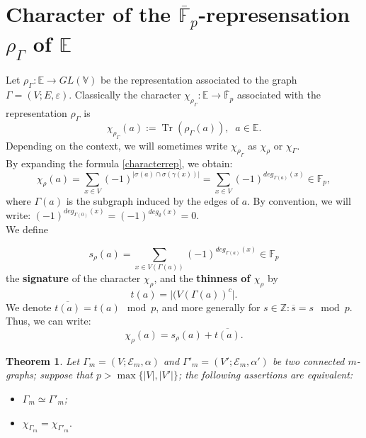 \documentclass[preprint,12pt,authoryear]{elsarticle}
\newtheorem{thm}{Theorem}[section]
\theoremstyle{definition}
\DeclareMathOperator{\Tr}{Tr}
\begin{document}
\section{Character of the $\overline{\mathbb{F}}_p$-represensation $\rho_{\Gamma}$ of $\mathbb{E}$ }


\noindent  Let ${\displaystyle \rho_{\Gamma} : \mathbb{E} \longrightarrow GL( \mathbb{V})}$ be the representation associated to the graph $\Gamma=(V;E,\varepsilon)$. 
Classically  the character $ \chi_{\rho_{\Gamma}}: \mathbb{E} \longrightarrow \overline{\mathbb{F}}_p$ associated with the representation $\rho_{\Gamma}$ is 
\begin{equation}\label{characterrep}
\chi_{\rho_{\Gamma}}(a):= \Tr(\rho_{\Gamma}(a)),  \;\; a \in \mathbb{E}.
\end{equation}
Depending on the context, we will sometimes write $\chi_{\rho_{\Gamma}}$ as $\chi_{\rho}$ or $\chi_{\Gamma}$.\\
By expanding the formula \ref{characterrep}, we obtain:
\begin{equation}
\chi_{\rho}(a) = \sum_{x \in V}(-1)^{| \sigma(a)\cap \sigma(\gamma(x))|}= \sum_{x \in V}(-1)^{deg_{\Gamma(a)}(x)} \in \mathbb{F}_p,
\end{equation}
where $\Gamma(a)$ is the subgraph induced by the edges of $a$. By convention, we will write: $ (-1)^{deg_{\Gamma(0)}(x)}=(-1)^{deg_{\emptyset}(x)} =0$.\\
We define 

\begin{equation}
s_{\rho}(a)=  \sum_{    x \in V(\Gamma(a))   }   (-1)^{deg_{\Gamma(a)}(x)  } \in \mathbb{F}_p
\end{equation}
the  {\bf signature} of the character $\chi_{\rho}$, and  the {\bf thinness of  $\chi_{\rho}$} by
\begin{equation}
t(a)= \vert(V(\Gamma(a))^c\vert.
\end{equation}
We denote $\overline{t(a)}= t(a) \mod p$, and more generally for $s \in \mathbb{Z}: \overline{s}= s \mod p.$\\
Thus, we can write:
\begin{equation}
\chi_{\rho}(a) = s_{\rho}(a)+ \overline{t(a)}.
\end{equation}


\begin{thm}  Let  $\Gamma_m=(V;\mathcal{E}_m, \alpha)$ and $\Gamma'_m=(V'; \mathcal{E}_m, \alpha')$ be two connected $m$-graphs; suppose  that $p > \max\{ |V|, |V'| \}$;
the following assertions are equivalent:
\begin{itemize}
\item[i)]  $\Gamma_m \simeq \Gamma'_m$;
\item[ii)] $\chi_{\Gamma_{m}} = \chi_{\Gamma'_{m}}.$
\end{itemize}
\end{thm}
\end{document}
